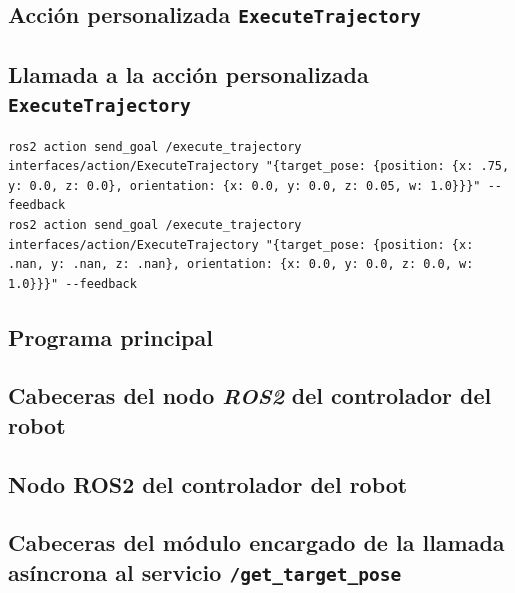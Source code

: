 \subsection*{Acción personalizada \texttt{ExecuteTrajectory}}


\subsection*{Llamada a la acción personalizada \texttt{ExecuteTrajectory}}
\begin{lstlisting}[style=luastyle, 
    caption={Llamada a la acción personalizada \texttt{ExecuteTrajectory}.}, 
    label={cod:actionClient}]
ros2 action send_goal /execute_trajectory interfaces/action/ExecuteTrajectory "{target_pose: {position: {x: .75, y: 0.0, z: 0.0}, orientation: {x: 0.0, y: 0.0, z: 0.05, w: 1.0}}}" --feedback
ros2 action send_goal /execute_trajectory interfaces/action/ExecuteTrajectory "{target_pose: {position: {x: .nan, y: .nan, z: .nan}, orientation: {x: 0.0, y: 0.0, z: 0.0, w: 1.0}}}" --feedback
\end{lstlisting}

\subsection*{Programa principal}



\subsection*{Cabeceras del nodo \textit{ROS2} del controlador del robot}


\subsection*{Nodo ROS2 del controlador del robot}


\subsection*{Cabeceras del módulo encargado de la llamada asíncrona al servicio \texttt{/get\_target\_pose}}



